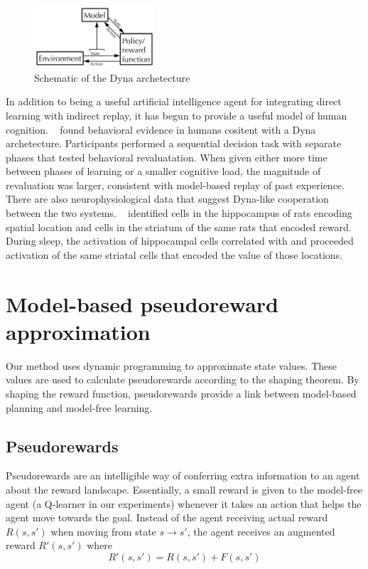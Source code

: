 \documentclass[letterpaper]{article}
\begin{document}
\begin{figure}[ht]
\centering
\includegraphics[width=0.4\textwidth]{dyna_schematic}
\caption{Schematic of the Dyna archetecture}
\label{fig:dyna_schematic}
\end{figure}

In addition to being a useful artificial intelligence agent for integrating direct learning with indirect replay, it has begun to provide a useful model of human cognition. ~\cite{gershman2014retrospective} found behavioral evidence in humans cositent with a Dyna archetecture.  Participants performed a sequential decision task with separate phases that tested behavioral revaluatation. When given either more time between phases of learning or a smaller cognitive load, the magnitude of revaluation was larger, consistent with model-based replay of past experience. There are also neurophysiological data that suggest Dyna-like cooperation between the two systems. ~\cite{lansink2009hippocampus} identified cells in the hippocampus of rats encoding spatial location and cells in the striatum of the same rats that encoded reward. During sleep, the activation of hippocampal cells correlated with and proceeded activation of the same striatal cells that encoded the value of those locations.

\section{Model-based pseudoreward approximation}

Our method uses dynamic programming to approximate state values. These values are used to calculate pseudorewards according to the shaping theorem. By shaping the reward function, pseudorewards provide a link between model-based planning and model-free learning.

\subsection{Pseudorewards}

Pseudorewards are an intelligible way of conferring extra information to an agent about the reward landscape. Essentially, a small reward is given to the model-free agent (a Q-learner in our experiments) whenever it takes an action that helps the agent move towards the goal. Instead of the agent receiving actual reward $R(s, s')$ when moving from state $s \rightarrow s'$, the agent receives an augmented reward $R'(s, s')$ where
\begin{equation}
R'(s, s') = R(s, s') + F(s, s')
\end{equation} 
\end{document}
